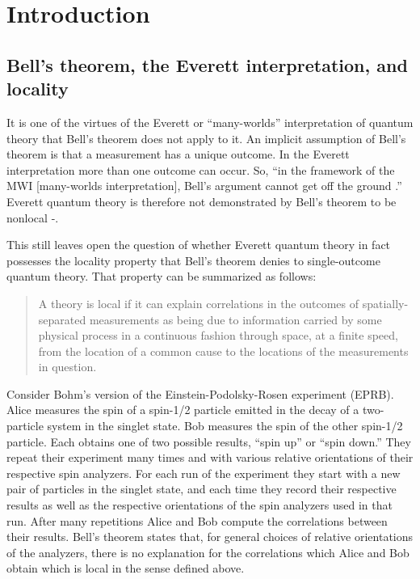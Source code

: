 \documentclass[12pt]{article}
\begin{document}
\section{Introduction} \label{SecIntro}

\subsection{Bell's theorem, the Everett interpretation, and locality}\label{SecBEL}



It is one of the virtues of the Everett or ``many-worlds'' interpretation \cite{Everett57} of quantum  theory
that  Bell's theorem \cite{Bell64} does not apply to it. 
An implicit assumption of Bell's theorem is that a measurement has a unique outcome.
In the Everett interpretation more than one outcome can occur. So,  ``in the framework of the MWI [many-worlds interpretation], 
Bell's argument cannot get off the ground 
\cite{Vaidman02}.''
Everett quantum theory is  therefore not demonstrated by Bell's theorem to be nonlocal \cite{Vaidman02}-\cite{HewittHorsman09}.

This  still leaves open the question of whether Everett quantum theory in fact possesses the locality  property that
Bell's theorem denies to single-outcome quantum theory.
That property can be summarized as follows: 


\begin{quote}
A theory is local if it can  explain correlations
in the outcomes of spatially-separated measurements as being due to information carried by some physical process
in a continuous fashion through space, at a finite speed, from the location of a common cause \cite{Reichenbach56} 
to the locations of the measurements in question.
\end{quote}

Consider Bohm's version \cite{Bohm51} of the Einstein-Podolsky-Rosen \cite{EPR}  experiment (EPRB). Alice measures
the spin of a spin-1/2 particle emitted in the decay of a two-particle system in the singlet state. Bob measures the spin of the other spin-1/2 particle. Each obtains one of two possible results, ``spin up''
or ``spin down.'' They repeat their experiment many times and with various  
relative orientations of their respective spin analyzers. For each run of the experiment they
start with a new pair of particles in the singlet state, and each time they record their respective results as 
well as the respective orientations of the spin analyzers used in that run. After many repetitions Alice and Bob compute the correlations
between their results. Bell's theorem states that, for general choices of relative orientations of the analyzers, 
there is no explanation for the correlations which Alice and Bob obtain which is local in the sense defined above.
\end{document}

